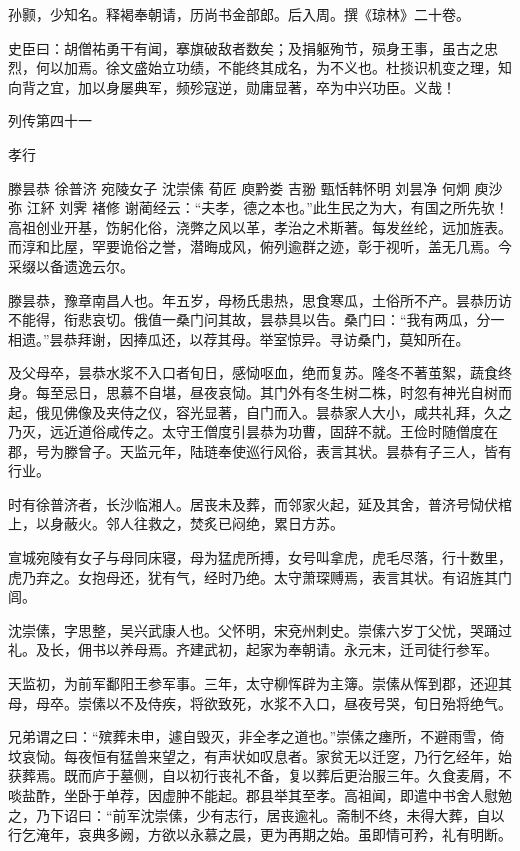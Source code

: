\documentclass[12pt,UTF8]{ctexbook}
\begin{document}
孙颢，少知名。释褐奉朝请，历尚书金部郎。后入周。撰《琼林》二十卷。

史臣曰：胡僧祐勇干有闻，搴旗破敌者数矣；及捐躯殉节，殒身王事，虽古之忠烈，何以加焉。徐文盛始立功绩，不能终其成名，为不义也。杜掞识机变之理，知向背之宜，加以身屡典军，频殄寇逆，勋庸显著，卒为中兴功臣。义哉！





列传第四十一

孝行

滕昙恭 徐普济 宛陵女子 沈崇傃 荀匠 庾黔娄 吉翂 甄恬韩怀明 刘昙净 何炯 庾沙弥 江紑 刘霁 褚修 谢蔺经云：“夫孝，德之本也。”此生民之为大，有国之所先欤！高祖创业开基，饬躬化俗，浇弊之风以革，孝治之术斯著。每发丝纶，远加旌表。而淳和比屋，罕要诡俗之誉，潜晦成风，俯列逾群之迹，彰于视听，盖无几焉。今采缀以备遗逸云尔。

滕昙恭，豫章南昌人也。年五岁，母杨氏患热，思食寒瓜，土俗所不产。昙恭历访不能得，衔悲哀切。俄值一桑门问其故，昙恭具以告。桑门曰：“我有两瓜，分一相遗。”昙恭拜谢，因捧瓜还，以荐其母。举室惊异。寻访桑门，莫知所在。

及父母卒，昙恭水浆不入口者旬日，感恸呕血，绝而复苏。隆冬不著茧絮，蔬食终身。每至忌日，思慕不自堪，昼夜哀恸。其门外有冬生树二株，时忽有神光自树而起，俄见佛像及夹侍之仪，容光显著，自门而入。昙恭家人大小，咸共礼拜，久之乃灭，远近道俗咸传之。太守王僧度引昙恭为功曹，固辞不就。王俭时随僧度在郡，号为滕曾子。天监元年，陆琏奉使巡行风俗，表言其状。昙恭有子三人，皆有行业。

时有徐普济者，长沙临湘人。居丧未及葬，而邻家火起，延及其舍，普济号恸伏棺上，以身蔽火。邻人往救之，焚炙已闷绝，累日方苏。

宣城宛陵有女子与母同床寝，母为猛虎所搏，女号叫拿虎，虎毛尽落，行十数里，虎乃弃之。女抱母还，犹有气，经时乃绝。太守萧琛赙焉，表言其状。有诏旌其门闾。

沈崇傃，字思整，吴兴武康人也。父怀明，宋兗州刺史。崇傃六岁丁父忧，哭踊过礼。及长，佣书以养母焉。齐建武初，起家为奉朝请。永元末，迁司徒行参军。

天监初，为前军鄱阳王参军事。三年，太守柳恽辟为主簿。崇傃从恽到郡，还迎其母，母卒。崇傃以不及侍疾，将欲致死，水浆不入口，昼夜号哭，旬日殆将绝气。

兄弟谓之曰：“殡葬未申，遽自毁灭，非全孝之道也。”崇傃之瘗所，不避雨雪，倚坟哀恸。每夜恒有猛兽来望之，有声状如叹息者。家贫无以迁窆，乃行乞经年，始获葬焉。既而庐于墓侧，自以初行丧礼不备，复以葬后更治服三年。久食麦屑，不啖盐酢，坐卧于单荐，因虚肿不能起。郡县举其至孝。高祖闻，即遣中书舍人慰勉之，乃下诏曰：“前军沈崇傃，少有志行，居丧逾礼。斋制不终，未得大葬，自以行乞淹年，哀典多阙，方欲以永慕之晨，更为再期之始。虽即情可矜，礼有明断。
\end{document}
